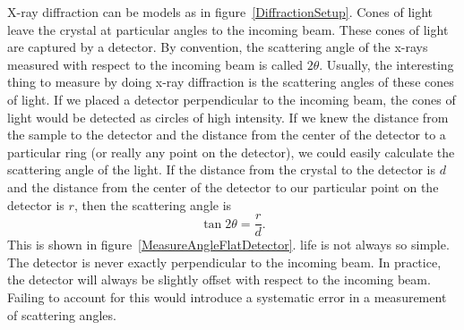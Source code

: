 \begin{SCfigure}[1][htbp]
    \centering
    
    \caption{An X-Ray diffraction setup. X-rays scatter from a 
    3-D sample and are captured by a 2-D detector. In this 
    setup, the detector is perpendicular to the incoming 
    x-ray beam.}
    \label{DiffractionSetup}
\end{SCfigure}

X-ray diffraction can be models as in figure~\ref{DiffractionSetup}. 
Cones of light leave the crystal at particular angles to 
the incoming beam. These cones of light are 
captured by a detector. By convention, the scattering angle 
of the x-rays measured with respect to the incoming beam is called 
$2\theta$. Usually, the interesting thing to measure by doing x-ray 
diffraction is the scattering angles of these cones of light. 
If we placed a detector perpendicular 
to the incoming beam, the cones of light would be detected as 
circles of high intensity. 
If we knew the distance from the sample to the detector and 
the distance from the center of the detector to a 
particular ring (or really any point on the detector), 
we could easily calculate the scattering angle of the
light. If the distance from the crystal to the detector 
is $d$ and the distance from the center of the detector 
to our particular point on the detector is $r$, then the 
scattering angle is
\begin{equation}
    \tan2\theta = \frac{r}{d}.
\end{equation}
This is shown in figure~\ref{MeasureAngleFlatDetector}. 
life is not always so simple. The detector is never
exactly perpendicular to the incoming beam.  In practice, 
the detector will always be slightly offset with respect 
to the incoming beam. Failing to account for this would
introduce a systematic error in a measurement of scattering
angles. 

\begin{SCfigure}[1][htbp]
    \centering
    
    \caption{The same setup as in figure~\ref{DiffractionSetup}. 
    We are now interested in some particular point on the 
    detector. $2\theta$ is the scattering angle of the light
    that gets to this point, $d$ is the distance 
    from the crystal to the detector, and $r$ is the distance 
    from the center of the detector to some particular point 
    (which $2\theta$ is associated with). By center 
    of the detector, we mean the point on the detector where 
    the beam would hit if did not interact with the crystal.}
    \label{MeasureAngleFlatDetector}
\end{SCfigure}

